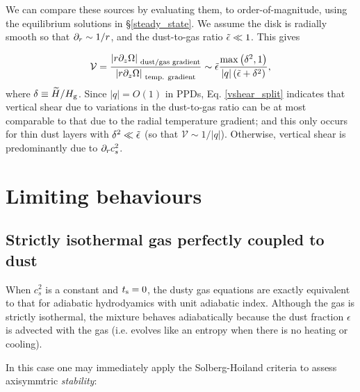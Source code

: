 We can compare these sources by
evaluating them, to order-of-magnitude, using the equilibrium
solutions in \S\ref{steady_state}. We assume the disk is radially
smooth so that $\partial_r\sim 1/r$, and the dust-to-gas ratio
$\tilde{\epsilon}\ll1$. This gives 

\begin{align}\label{vshear_split}
  \mathcal{V} =  \frac{\left|r\partial_z\Omega\right|_{\text{
        dust/gas gradient}}}{\left|r\partial_z\Omega\right|_{\text{
        temp. gradient}}} \sim
  \tilde{\epsilon} \frac{\mathrm{max}\left(\delta^2,
    1\right)}{\left|q\right|\left(\tilde{\epsilon} + \delta^2\right)},
\end{align}
where $\delta\equiv \widetilde{H}/H_\mathrm{g}$. 
Since $|q|=O(1)$ in PPDs, Eq. \ref{vshear_split} indicates that
vertical shear due to variations in the dust-to-gas ratio can be at
most comparable to that due to the radial temperature gradient; and
this only occurs for thin dust layers with $\delta^2\ll \tilde{\epsilon}$ (so
that $\mathcal{V}\sim 1/|q|$). Otherwise, vertical shear is
predominantly due to $\partial_rc_s^2$. 


\section{Limiting behaviours}

\subsection{Strictly isothermal gas perfectly coupled to dust}  
When $c_s^2$ is a constant and $t_\mathrm{s}=0$, the dusty gas equations are
exactly equivalent to that for adiabatic hydrodyamics with unit adiabatic
index. Although the gas is strictly isothermal, the mixture behaves 
adiabatically because the dust fraction $\epsilon$ is advected with
the gas (i.e. evolves like an entropy when there is no heating or
cooling). 

In this case one may immediately apply the Solberg-Hoiland
criteria to assess axisymmtric \emph{stability}:  

